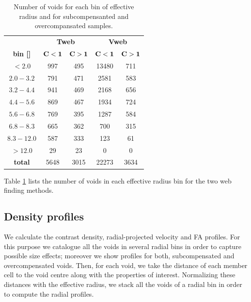 \documentclass[a4,useAMS,usenatbib,usegraphicx]{mn2e}
\newcommand{\hMpc}{{\ifmmode{h^{-1}{\rm Mpc}}\else{$h^{-1}$Mpc}\fi}}
\begin{document}
\begin{table}[!htbp]
\centering
\begin{tabular}{c | c c | c c}
\toprule
\multicolumn{1}{c}{}&  \multicolumn{2}{c}{\textbf{Tweb}} & \multicolumn{2}{c}{\textbf{Vweb}}\\
\textbf{bin [\hMpc]}   & $\bf{C<1}$   & $\bf{C>1}$    & $\bf{C<1}$   & $\bf{C>1}$\\ \hline
$<2.0$        &  997 & 495   & 13480  & 711\\
$2.0-3.2$     &  791 & 471   & 2581   & 583\\
$3.2-4.4$     &  941 & 469   & 2168   & 656\\
$4.4-5.6$     &  869 & 467   & 1934   & 724\\
$5.6-6.8$     &  769 & 395   & 1287   & 584\\
$6.8-8.3$     &  665 & 362   & 700    & 315\\
$8.3-12.0$    &  587 & 333   & 123    & 61\\
$>12.0$       &  29  & 23    & 0      & 0\\ \hline
\textbf{total}& 5648 & 3015  & 22273  & 3634\\
\bottomrule
\end{tabular}
\caption{Number of voids for each bin of effective radius and for 
subcompensanted and overcompansated samples.}
\label{tab:number_voids}
\end{table}

Table \ref{tab:number_voids} lists the number of voids in 
each effective radius bin for the two web finding methods.


\subsection{Density profiles}
\label{subsec:density_voids}


We calculate the contrast density, radial-projected velocity and 
FA profiles. For this purpose we catalogue all the voids in several radial 
bins in order to capture possible size effects; moreover we show profiles 
for both, subcompensated and overcompensated voids. Then, for each void, 
we take the distance of each member cell to the void centre along with the 
properties of interest. Normalizing these distances with the effective 
radius, we stack all the voids of a radial bin in order to compute the 
radial profiles.
\end{document}
